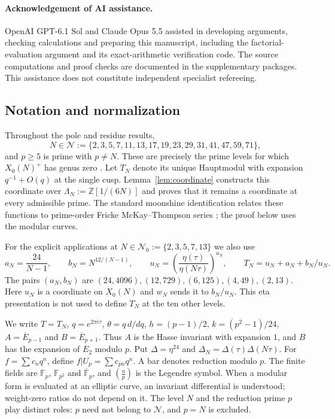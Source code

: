 \documentclass[11pt,a4paper]{article}
\numberwithin{equation}{section}
\theoremstyle{definition}
\theoremstyle{remark}
\newcommand{\Fp}{\mathbb F_p}
\newcommand{\Fq}{\mathbb F_{p^2}}
\newcommand{\Fb}{\overline{\mathbb F}_p}
\newcommand{\Z}{\mathbb Z}
\begin{document}
\paragraph{Acknowledgement of AI assistance.}
OpenAI GPT-6.1 Sol and Claude Opus 5.5 assisted in developing arguments, checking 
calculations and preparing this manuscript, including the factorial-evaluation 
argument and its exact-arithmetic verification code. The source computations
and proof checks are documented in the supplementary packages.
This assistance does not constitute independent specialist refereeing.

\subsection{Notation and normalization}
Throughout the pole and residue results,
\[
N\in\mathcal N:=\{2,3,5,7,11,13,17,19,23,29,31,41,47,59,71\},
\]
and $p\ge5$ is prime with $p\ne N$.
These are precisely the prime levels for which $X_0(N)^+$ has genus
zero \citep[\S3, Corollary]{Ogg75}. Let $T_N$ denote its unique
Hauptmodul with expansion $q^{-1}+O(q)$ at the single cusp.
Lemma~\ref{lem:coordinate} constructs this coordinate over
$\Lambda_N:=\Z[1/(6N)]$ and proves that it remains a coordinate
at every admissible prime. The standard moonshine identification
relates these functions to prime-order Fricke McKay--Thompson series
\citep{CN79,CMT19}; the proof below uses the modular curves.

For the explicit applications at
$N\in\mathcal N_0:=\{2,3,5,7,13\}$ we also use
\[
a_N=\frac{24}{N-1},\qquad b_N=N^{12/(N-1)},\qquad
u_N=\left(\frac{\eta(\tau)}{\eta(N\tau)}\right)^{a_N},\qquad
T_N=u_N+a_N+b_N/u_N.
\]
The pairs $(a_N,b_N)$ are $(24,4096),(12,729),(6,125),(4,49),(2,13)$.
Here $u_N$ is a coordinate on $X_0(N)$ and $w_N$ sends it to $b_N/u_N$.
This eta presentation is not used to define $T_N$ at the ten other levels.

We write $T=T_N$, $q=e^{2\pi i\tau}$, $\theta=q\,d/dq$,
$h=(p-1)/2$, $k=(p^2-1)/24$, $A=\overline E_{p-1}$ and
$B=\overline E_{p+1}$. Thus $A$ is the Hasse invariant with expansion
$1$, and $B$ has the expansion of $E_2$ modulo $p$. Put
$\Delta=\eta^{24}$ and $\Delta_N=\Delta(\tau)\Delta(N\tau)$.
For $f=\sum c_nq^n$, define $f|U_p=\sum c_{pn}q^n$.
A bar denotes reduction modulo $p$. The finite fields are
$\Fp$, $\Fq$ and $\Fb$, and $\left(\frac{a}{p}\right)$ is the Legendre symbol.
When a modular form is evaluated at an elliptic curve, an invariant
differential is understood; weight-zero ratios do not depend on it.
The level $N$ and the reduction prime $p$ play distinct roles:
$p$ need not belong to $\mathcal N$, and $p=N$ is excluded.
\end{document}
